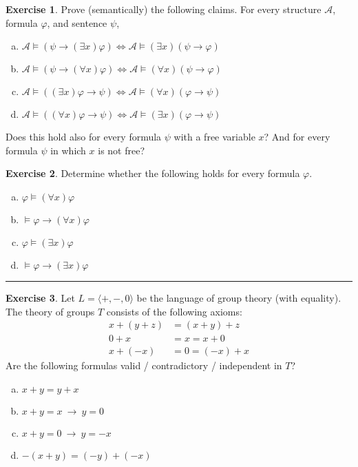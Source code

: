 \documentclass[11pt,a4paper]{amsart}
\theoremstyle{definition}
\newtheorem{problem}{Exercise}
\begin{document}
\begin{problem}
Prove (semantically) the following claims. For every structure $\mathcal{A}$, formula $\varphi$, and sentence $\psi$,
\begin{multicols}{2}
\begin{enumerate}[(a)]
\item $\mathcal{A}\models (\psi \to (\exists x)\varphi) \Leftrightarrow \mathcal{A}\models (\exists x)(\psi \to \varphi)$
\item $\mathcal{A}\models (\psi \to (\forall x)\varphi) \Leftrightarrow \mathcal{A}\models (\forall x)(\psi \to \varphi)$
\item $\mathcal{A}\models ((\exists x)\varphi \to \psi) \Leftrightarrow \mathcal{A}\models (\forall x)(\varphi \to \psi)$
\item $\mathcal{A}\models ((\forall x)\varphi \to \psi ) \Leftrightarrow \mathcal{A}\models (\exists x)(\varphi \to \psi)$
\end{enumerate}
\end{multicols}

Does this hold also for every formula $\psi$ with a free variable $x$? And for every formula $\psi$ in which $x$ is not free?
\end{problem}

\smallskip\begin{problem}
Determine whether the following holds for every formula $\varphi$.
\begin{multicols}{2}
\begin{enumerate}[(a)]
   \item $\varphi \models (\forall x)\varphi$
   \item $\models \varphi \to (\forall x)\varphi$
   \item $\varphi \models (\exists x)\varphi$
   \item $\models \varphi \to (\exists x)\varphi$
\end{enumerate}
\end{multicols}
\end{problem}

\hrule

\begin{problem}
Let $L=\langle +, -, 0\rangle$ be the language of group theory (with equality). The theory of groups $T$ consists of the following axioms:
\begin{align*}
x+(y+z)&=(x+y)+z\\
0+x&=x=x+0\\
x+(-x)&=0=(-x)+x
\end{align*}
Are the following formulas valid / contradictory / independent in $T$?
\begin{enumerate}[(a)]
    \item $x+y=y+x$
    \item $x+y=x\ \rightarrow\ y=0$
    \item $x+y=0\ \rightarrow\ y=-x$
    \item $-(x+y)=(-y)+(-x)$
\end{enumerate}
\end{problem}
\end{document}
